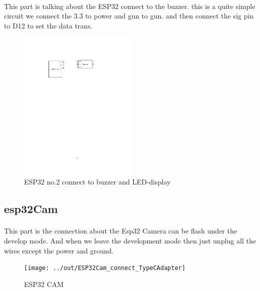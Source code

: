 \documentclass[12pt]{report}        %
\begin{document}
    \paragraph{}
    This part is talking about the ESP32 connect to the buzzer.
    this is a quite simple circuit we connect the 3.3 to power and gun to gun.
    and then connect the sig pin to D12 to set the data trans.

    \blindtext{}



    \begin{figure}[h]
        \caption{ESP32 no.2 connect to buzzer and LED-display}\label{fig:figure3}
        \centering
        \includegraphics[width=0.5\textwidth]{../out/ESP32_No.2_connect_Buzzer}
    \end{figure}

    \subsection{esp32Cam }\label{subsec:esp32cam}
    \paragraph{}
    This part is the connection about the Esp32 Camera can be flash under the develop mode.
    And when we leave the development mode then just unplug all the wires except the power and ground.

    \blindtext{}



    \begin{figure}[h]
        \caption{ESP32 CAM}\label{fig:figure4}
        \centering
        \texttt{[image: ../out/ESP32Cam\_connect\_TypeCAdapter]}
    \end{figure}



    
    
\end{document}
